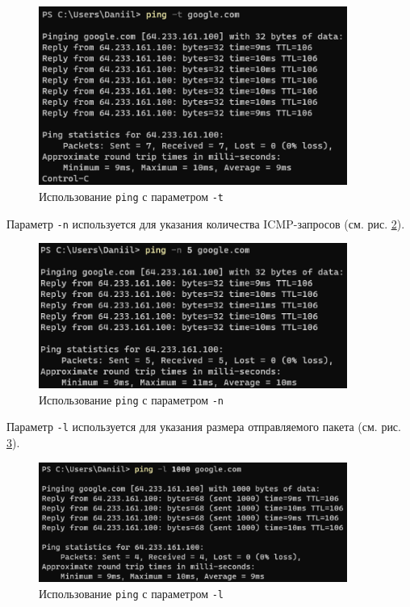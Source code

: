 \documentclass[a4paper, 14pt]{extarticle}
\begin{document}
\begin{figure}[H]
  \centering
  \includegraphics[width=0.9\textwidth]{images/ping/infinity.png}
  \caption{Использование \texttt{ping} с параметром \texttt{-t}}
  \label{fig:ping-infinity}
\end{figure}

Параметр \texttt{-n} используется для указания количества ICMP-запросов (см.
рис. \ref{fig:ping-n}).

\begin{figure}[H]
  \centering
  \includegraphics[width=0.9\textwidth]{images/ping/n.png}
  \caption{Использование \texttt{ping} с параметром \texttt{-n}}
  \label{fig:ping-n}
\end{figure}

Параметр \texttt{-l} используется для указания размера отправляемого пакета
(см. рис. \ref{fig:ping-size}).

\begin{figure}[H]
  \centering
  \includegraphics[width=0.9\textwidth]{images/ping/size.png}
  \caption{Использование \texttt{ping} с параметром \texttt{-l}}
  \label{fig:ping-size}
\end{figure}
\end{document}
